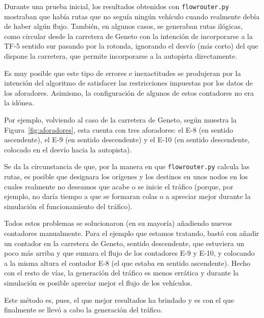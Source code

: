 Durante una prueba inicial, los resultados obtenidos con \texttt{flowrouter.py} mostraban que había rutas que no seguía ningún vehículo cuando realmente debía de haber algún flujo. También, en algunos casos, se generaban rutas ilógicas, como circular desde la carretera de Geneto con la intención de incorporarse a la TF-5 sentido sur pasando por la rotonda, ignorando el desvío (más corto) del que dispone la carretera, que permite incorporarse a la autopista directamente.

Es muy posible que este tipo de errores e inexactitudes se produjeran por la intención del algoritmo de satisfacer las restricciones impuestas por los datos de los aforadores. Asimismo, la configuración de algunos de estos contadores no era la idónea. 

Por ejemplo, volviendo al caso de la carretera de Geneto, según muestra la Figura~\ref{fig:aforadores}, esta cuenta con tres aforadores: el E-8 (en sentido ascendente), el E-9 (en sentido descendente) y el E-10 (en sentido descendente, colocado en el desvío hacia la autopista).

Se da la circunstancia de que, por la manera en que \texttt{flowrouter.py} calcula las rutas, es posible que designara los orígenes y los destinos en unos nodos en los cuales realmente no deseamos que acabe o se inicie el tráfico (porque, por ejemplo, no daría tiempo a que se formaran colas o a apreciar mejor durante la simulación el funcionamiento del tráfico).

Todos estos problemas se solucionaron (en su mayoría) añadiendo nuevos contadores manualmente. Para el ejemplo que estamos tratando, bastó con añadir un contador en la carretera de Geneto, sentido descendente, que estuviera un poco más arriba y que sumara el flujo de los contadores E-9 y E-10, y colocando a la misma altura el contador E-8 (el que estaba en sentido ascendente). Hecho con el resto de vías, la generación del tráfico es menos errática y durante la simulación es posible apreciar mejor el flujo de los vehículos.

Este método es, pues, el que mejor resultados ha brindado y es con el que finalmente se llevó a cabo la generación del tráfico.